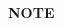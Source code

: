 \documentclass[a4paper, 15pt]{article}
\begin{document}
\begin{adjustwidth}{2in}{}
\newpage

{\LARGE \textbf{NOTE}}
	
\end{adjustwidth}
\end{document}
